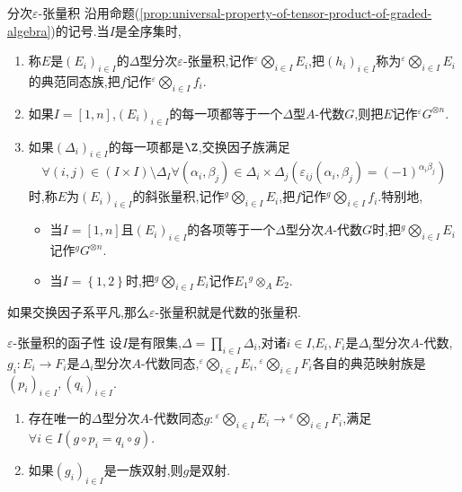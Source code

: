 \begin{definition}{分次$\varepsilon$-张量积}{}
	沿用命题(\cref{prop:universal-property-of-tensor-product-of-graded-algebra})的记号.当$I$是全序集时,
	\begin{enumerate}
		\item 称$E$是$\left(E_{i}\right)_{i\in I}$的$\Delta$型分次$\varepsilon$-张量积,记作${}^{\varepsilon}\bigotimes\limits_{i\in I}E_{i}$,把$\left(h_{i}\right)_{i\in I}$称为${}^{\varepsilon}\bigotimes\limits_{i\in I}E_{i}$的典范同态族,把$f$记作${}^{\varepsilon}\bigotimes\limits_{i\in I}f_{i}$.
		\item 如果$I=\left[1,n\right]$,$\left(E_{i}\right)_{i\in I}$的每一项都等于一个$\Delta$型$A$-代数$G$,则把$E$记作${}^{\varepsilon}G^{\otimes n}$.
		\item 如果$\left(\Delta_{i}\right)_{i\in I}$的每一项都是$\Z$,交换因子族满足
		\begin{align*}
			\forall\left(i,j\right)\in\left(I\times I\right)\setminus\Delta_{I}\forall\left(\alpha_{i},\beta_{j}\right)\in\Delta_{i}\times\Delta_{j}\left(\varepsilon_{ij}\left(\alpha_{i},\beta_{j}\right)=\left(-1\right)^{\alpha_{i}\beta_{j}}\right)
		\end{align*}
		时,称$E$为$\left(E_{i}\right)_{i\in I}$的斜张量积,记作${}^{g}\bigotimes\limits_{i\in I}E_{i}$,把$f$记作${}^{g}\bigotimes\limits_{i\in I}f_{i}$.特别地,
		\begin{itemize}
			\item 当$I=\left[1,n\right]$且$\left(E_{i}\right)_{i\in I}$的各项等于一个$\Delta$型分次$A$-代数$G$时,把${}^{g}\bigotimes\limits_{i\in I}E_{i}$记作$^{g}G^{\otimes n}$.
			\item 当$I=\left\{1,2\right\}$时,把${}^{g}\bigotimes\limits_{i\in I}E_{i}$记作$E_{1}{}^{g}\otimes_{A}E_{2}$.
		\end{itemize}
	\end{enumerate}
\end{definition}

\begin{remark}{}{}
	如果交换因子系平凡,那么$\varepsilon$-张量积就是代数的张量积.
\end{remark}

\begin{corollary}{$\varepsilon$-张量积的函子性}{}
	设$I$是有限集,$\Delta=\prod\limits_{i\in I}\Delta_{i}$,对诸$i\in I$,$E_{i},F_{i}$是$\Delta_{i}$型分次$A$-代数,$g_{i}:E_{i}\to F_{i}$是$\Delta_{i}$型分次$A$-代数同态,${}^{\varepsilon}\bigotimes\limits_{i\in I}E_{i},{}^{\varepsilon}\bigotimes\limits_{i\in I}F_{i}$各自的典范映射族是$\left(p_{i}\right)_{i\in I},\left(q_{i}\right)_{i\in I}$.
	\begin{enumerate}
		\item 存在唯一的$\Delta$型分次$A$-代数同态$g:{}^{\varepsilon}\bigotimes\limits_{i\in I}E_{i}\to{}^{\varepsilon}\bigotimes\limits_{i\in I}F_{i}$,满足$\forall i\in I\left(g\circ p_{i}=q_{i}\circ g\right)$.
		\item 如果$\left(g_{i}\right)_{i\in I}$是一族双射,则$g$是双射.
	\end{enumerate}
\end{corollary}

